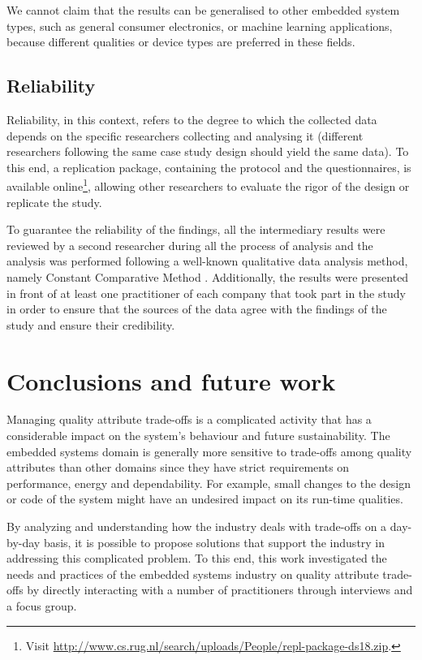 We cannot claim that the results can be generalised to other embedded system types, such as general consumer electronics, or machine learning applications, because different qualities or device types are preferred in these fields.

\subsection{Reliability}
Reliability, in this context, refers to the degree to which the collected data depends on the specific researchers collecting and analysing it (different researchers following the same case study design should yield the same data).
To this end, a replication package, containing the protocol and the questionnaires, is available online\footnote{Visit \url{http://www.cs.rug.nl/search/uploads/People/repl-package-ds18.zip}. }, allowing other researchers to evaluate the rigor of the design or replicate the study.

To guarantee the reliability of the findings, all the intermediary results were reviewed by a second researcher during all the process of analysis and the analysis was performed following a well-known qualitative data analysis method, namely Constant Comparative Method \cite{Boeije2002}. 
Additionally, the results were presented in front of at least one practitioner of each company that took part in the study in order to ensure that the sources of the data agree with the findings of the study and ensure their credibility.

\section{Conclusions and future work}\label{c7:sec:conclusion}
Managing quality attribute trade-offs is a complicated activity that has a considerable impact on the system's behaviour and future sustainability.
The embedded systems domain is generally more sensitive to trade-offs among quality attributes than other domains since they have strict requirements on performance, energy and dependability.
For example, small changes to the design or code of the system might have an undesired impact on its run-time qualities.

By analyzing and understanding how the industry deals with trade-offs on a day-by-day basis, it is possible to propose solutions that support the industry in addressing this complicated problem.
To this end, this work investigated the needs and practices of the embedded systems industry on quality attribute trade-offs by directly interacting with a number of practitioners through interviews and a focus group.

